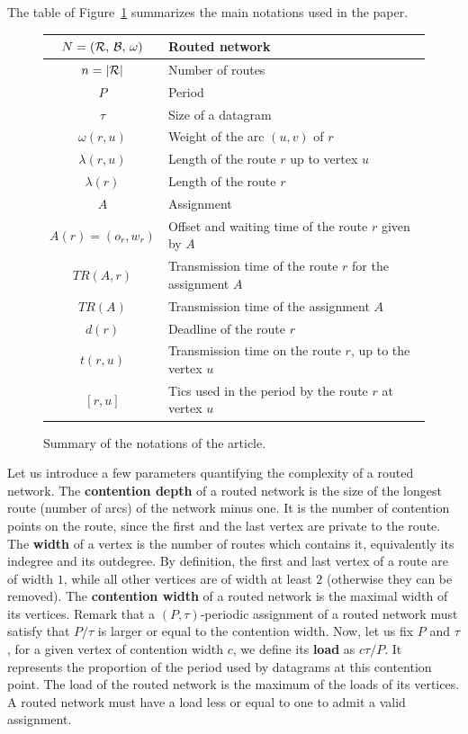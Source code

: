 \documentclass[a4paper,10pt]{journal}
\begin{document}
      The table of Figure~\ref{tab:summary} summarizes the main notations used in the paper.
    \begin{figure}
      \begin{center}
    \begin{tabularx}{\textwidth}{|c|X|}
    \hline
     $N = (\cal{R},\,\cal{B},\,\omega)$ & Routed network \\
     \hline
     $n = |\cal{R}|$ & Number of routes\\
     \hline
     $P$ & Period\\
     \hline
     $\tau$ & Size of a datagram\\
     \hline
     $\omega(r,u)$ & Weight of the arc $(u,v)$ of $r$ \\
     \hline
     $\lambda(r,u)$ & Length of the route $r$ up to vertex $u$\\
     \hline
     $\lambda(r)$ & Length of the route $r$\\
     \hline 
     $A$ & Assignment\\
     \hline 
     $A(r) = (o_r,w_r)$ & Offset and waiting time of the route $r$ given by $A$ \\
     \hline 
     $TR(A,r)$& Transmission time of the route $r$ for the assignment $A$\\
     \hline 
     $TR(A)$& Transmission time of the assignment $A$\\
     \hline
     $d(r)$ & Deadline of the route $r$\\
     \hline
	 $t(r,u)$ & Transmission time on the route $r$, up to the vertex $u$\\
     \hline
     $ [r,u]$ & Tics used in the period by the route $r$ at vertex $u$\\
     \hline
      \end{tabularx}
      \end{center}
      \caption{Summary of the notations of the article.}\label{tab:summary}
    \end{figure}
  	
  	Let us introduce a few parameters quantifying the complexity of a routed network.
	The \textbf{contention depth} of a routed network is the size of the longest route (number of arcs) of the network minus one. It is the number of contention points on the route, since the first and the last vertex are private to the route. The \textbf{width} of a vertex is the number of routes which contains it, equivalently its indegree and its outdegree. By definition, 
	the first and last vertex of a route are of width $1$, while all other vertices are of width at least $2$
	(otherwise they can be removed).
	The \textbf{contention width} of a routed network is the maximal width of its vertices. 
	Remark that a $(P,\tau)$-periodic assignment of a routed network must satisfy that $P/\tau$ is larger or equal to the contention width. Now, let us fix $P$ and $\tau$, for a given vertex of contention width $c$, we define its \textbf{load} as $c\tau/P$. It represents the proportion of the period used by datagrams at this contention point. The load of the routed network is the maximum of the loads of its vertices. A routed network must have a load less or equal to one to admit a valid assignment.
\end{document}
